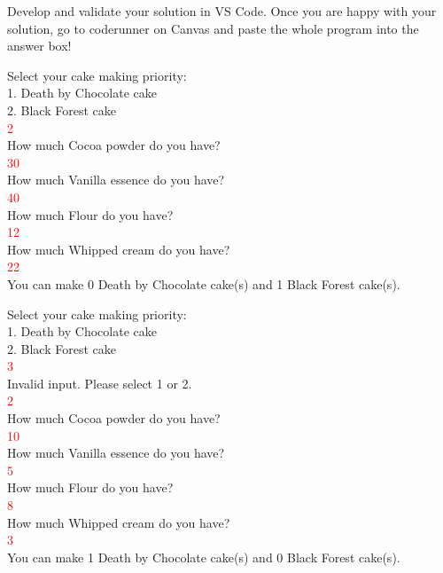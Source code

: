 Develop and validate your solution in VS Code. Once you are happy with your solution, go to coderunner on Canvas and paste the whole program into the answer box! 

\begin{sample}
Select your cake making priority:
\\1. Death by Chocolate cake
\\2. Black Forest cake
\\\textcolor{red}{2}
\\How much Cocoa powder do you have?
\\\textcolor{red}{30}
\\How much Vanilla essence do you have?
\\\textcolor{red}{40}
\\How much Flour do you have?
\\\textcolor{red}{12}
\\How much Whipped cream do you have?
\\\textcolor{red}{22}
\\You can make 0 Death by Chocolate cake(s) and 1 Black Forest cake(s).
\end{sample}


\begin{sample}
Select your cake making priority:
\\1. Death by Chocolate cake
\\2. Black Forest cake
\\\textcolor{red}{3}
\\Invalid input. Please select 1 or 2.
\\\textcolor{red}{2}
\\How much Cocoa powder do you have?
\\\textcolor{red}{10}
\\How much Vanilla essence do you have?
\\\textcolor{red}{5}
\\How much Flour do you have?
\\\textcolor{red}{8}
\\How much Whipped cream do you have?
\\\textcolor{red}{3}
\\You can make 1 Death by Chocolate cake(s) and 0 Black Forest cake(s).
\end{sample}

